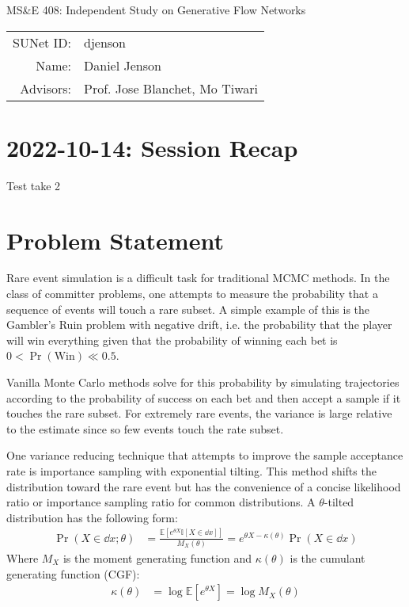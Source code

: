 \documentclass[12pt]{article}
\begin{document}
\begin{center}
  {\Large MS\&E 408: Independent Study on Generative Flow Networks}

	\begin{tabular}{rl}
		SUNet ID:      & djenson                            \\
		Name:          & Daniel Jenson                      \\
		Advisors: & Prof. Jose Blanchet, Mo Tiwari
	\end{tabular}
\end{center}

\section*{2022-10-14: Session Recap}
Test take 2

\section*{Problem Statement}
Rare event simulation is a difficult task for traditional MCMC methods. In the
class of committer problems, one attempts to measure the probability that a
sequence of events will touch a rare subset. A simple example of this is the
Gambler's Ruin problem with negative drift, i.e. the probability that the
player will win everything given that the probability of winning each bet is $0
< \Pr(\text{Win}) \ll 0.5$.
\par
Vanilla Monte Carlo methods solve for this probability by simulating
trajectories according to the probability of success on each bet and then
accept a sample if it touches the rare subset. For extremely rare events, the
variance is large relative to the estimate since so few events touch the rate
subset.
\par
One variance reducing technique that attempts to improve the sample acceptance
rate is importance sampling with exponential tilting. This method shifts the
distribution toward the rare event but has the convenience of a concise
likelihood ratio or importance sampling ratio for common distributions. A
$\theta$-tilted distribution has the following form:
\[
  \begin{aligned}
      \Pr(X\in\dd x;\theta) &= \frac{\mathbb{E}\left[e^{\theta X}\mathbb{I}[X\in\dd x]\right]}{M_X(\theta)}=e^{\theta X-\kappa(\theta)}\Pr(X\in\dd x)
  \end{aligned}
\]
Where $M_X$ is the moment generating function and $\kappa(\theta)$ is the
cumulant generating function (CGF):
\[
  \begin{aligned}
    \kappa(\theta) &= \log \mathbb{E}\left[e^{\theta X}\right]=\log M_X(\theta) \\
  \end{aligned}
\]
\end{document}
